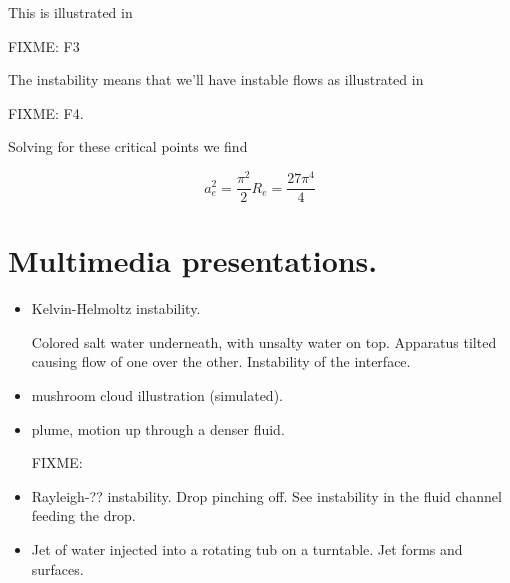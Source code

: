 This is illustrated in 

FIXME: F3

The instability means that we'll have instable flows as illustrated in 

FIXME: F4.

Solving for these critical points we find

\begin{subequations}
\begin{equation}\label{eqn:continuumL22:530}
a_e^2 = \frac{\pi^2}{2}
\end{equation}
\begin{equation}\label{eqn:continuumL22:550}
R_e = \frac{27 \pi^4}{4}
\end{equation}
\end{subequations}


\section{Multimedia presentations.}

\begin{itemize}
\item Kelvin-Helmoltz instability.

Colored salt water underneath, with unsalty water on top.  Apparatus tilted causing flow of one over the other.  Instability of the interface.

\item mushroom cloud illustration (simulated).

\item plume, motion up through a denser fluid.

FIXME:
\item Rayleigh-?? instability.  Drop pinching off.  See instability in the fluid channel feeding the drop.

\item Jet of water injected into a rotating tub on a turntable.  Jet forms and surfaces.
\end{itemize}

\EndNoBibArticle
